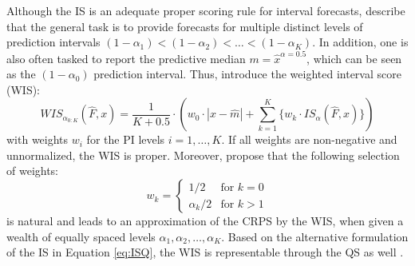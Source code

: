 \documentclass[a4paper,oneside,bibliography=totoc]{scrbook}
\begin{document}
Although the IS is an adequate proper scoring rule for interval forecasts, \citet{bracher_evaluating_2021} describe that the general task is to provide forecasts for multiple distinct levels of prediction intervals $(1 - \alpha_1) < (1 - \alpha_2) < \ldots < (1 - \alpha_K)$. In addition, one is also often tasked to report the predictive median $m=\hat{x}^{\alpha =0.5}$, which can be seen as the $(1 - \alpha_0)$ prediction interval. Thus, \citet{bracher_evaluating_2021} introduce the weighted interval score (WIS):
\begin{equation}
    WIS_{\alpha_{0:K}}(\hat{F}, x)=\frac{1}{K+0.5}\cdot \left(w_0\cdot |x-\hat{m}|+\sum_{k=1}^K\{ w_k\cdot IS_\alpha(\hat{F},x)\} \right)
    \label{eq:WIS}
\end{equation}
with weights $w_i$ for the PI levels $i = 1, \ldots , K$. If all weights are non-negative and unnormalized, the WIS is proper. Moreover, \citet{bracher_evaluating_2021} propose that the following selection of weights:
\begin{equation}
    w_k=
    \begin{cases}
      1/2 & \text{for $k=0$}\\
      \alpha_k/2 & \text{for $k>1$}
    \end{cases}
    \label{eq:WIS_weights}
\end{equation}
is natural and leads to an approximation of the CRPS by the WIS, when given a wealth of equally spaced levels $\alpha_1, \alpha_2, \ldots, \alpha_K$. 
Based on the alternative formulation of the IS in Equation \ref{eq:ISQ}, the WIS is representable through the QS as well \cite{bracher_evaluating_2021}.
\end{document}
